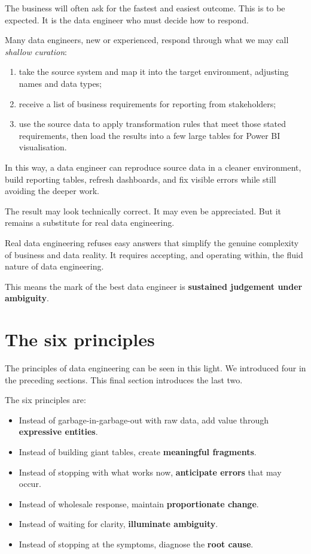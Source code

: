 \documentclass[10pt,openany,10pt]{book}
\providecommand{\tightlist}{%
  \setlength{\itemsep}{0pt}\setlength{\parskip}{0pt}}
\begin{document}
The business will often ask for the fastest and easiest outcome. This is
to be expected. It is the data engineer who must decide how to respond.

Many data engineers, new or experienced, respond through what we may
call \emph{shallow curation}:

\begin{enumerate}
\def\labelenumi{\arabic{enumi}.}
\tightlist
\item
  take the source system and map it into the target environment,
  adjusting names and data types;
\item
  receive a list of business requirements for reporting from
  stakeholders;
\item
  use the source data to apply transformation rules that meet those
  stated requirements, then load the results into a few large tables for
  Power BI visualisation.
\end{enumerate}

In this way, a data engineer can reproduce source data in a cleaner
environment, build reporting tables, refresh dashboards, and fix visible
errors while still avoiding the deeper work.

The result may look technically correct. It may even be appreciated. But
it remains a substitute for real data engineering.

Real data engineering refuses easy answers that simplify the genuine
complexity of business and data reality. It requires accepting, and
operating within, the fluid nature of data engineering.

This means the mark of the best data engineer is \textbf{sustained
judgement under ambiguity}.

\section{The six principles}\label{the-six-principles}

The principles of data engineering can be seen in this light. We
introduced four in the preceding sections. This final section introduces
the last two.

The six principles are:

\begin{itemize}
\tightlist
\item
  Instead of garbage-in-garbage-out with raw data, add value through
  \textbf{expressive entities}.
\item
  Instead of building giant tables, create \textbf{meaningful
  fragments}.
\item
  Instead of stopping with what works now, \textbf{anticipate errors}
  that may occur.
\item
  Instead of wholesale response, maintain \textbf{proportionate change}.
\item
  Instead of waiting for clarity, \textbf{illuminate ambiguity}.
\item
  Instead of stopping at the symptoms, diagnose the \textbf{root cause}.
\end{itemize}
\end{document}
